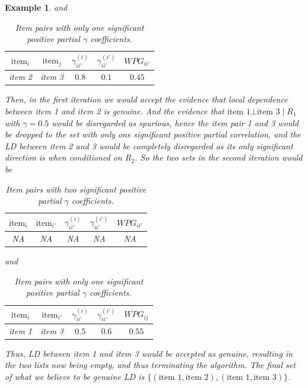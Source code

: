 \documentclass[a4project,12pt]{article}
\theoremstyle{examplestyle}
\newtheorem{example}{Example}[section]
\theoremstyle{defstyle}
\theoremstyle{thmstyle}
\begin{document}
\begin{mybox3}
\begin{example}
and 
\begin{table}[H]
    \centering
    \caption{Item pairs with only one significant positive partial $\gamma$ coefficients.}
    \begin{tabular}{c c c c c}
    \hline 
    $\text{item}_i$ & $\text{item}_j$ & $\gamma_{ii'}^{(i)}$ & $\gamma_{ii'}^{(i')}$ & $WPG_{ii'}$ \\
    \hline
         item 2 & item 3 & $0.8$ & $0.1$ & $0.45$  \\
         \hline
    \end{tabular}
    \label{tab:placeholder2}
\end{table}
Then, in the first iteration we would accept the evidence that local dependence between item 1 and item 2 is genuine. And the evidence that $\text{item 1}\bot \text{item 3}\mid R_1$ with $\gamma = 0.5$ would be disregarded as spurious, hence the item pair 1 and 3 would be dropped to the set with only one significant positive partial correlation, and the LD between item 2 and 3 would be completely disregarded as its only significant direction is when conditioned on $R_2$. So the two sets in the second iteration would be
\begin{table}[H]
    \centering
    \caption{Item pairs with two significant positive partial $\gamma$ coefficients.}
    \begin{tabular}{c c c c c}
    \hline 
    $\text{item}_i$ & $\text{item}_{i'}$ & $\gamma_{ii'}^{(i)}$ & $\gamma_{ii'}^{(i')}$ & $WPG_{ii'}$ \\
    \hline
         NA & NA & NA & NA & NA  \\
         \hline
    \end{tabular}
    \label{tab:placeholder3}
\end{table}
and 
\begin{table}[H]
    \centering
    \caption{Item pairs with only one significant positive partial $\gamma$ coefficients.}
    \begin{tabular}{c c c c c}
    \hline 
    $\text{item}_i$ & $\text{item}_{i'}$ & $\gamma_{ii'}^{(i)}$ & $\gamma_{ii'}^{(i')}$ & $WPG_{ij}$ \\
    \hline
         item 1 & item 3 & $0.5$ & $0.6$ & $0.55$  \\
         \hline
    \end{tabular}
    \label{tab:placeholder4}
\end{table}
Thus, LD between item 1 and item 3 would be accepted as genuine, resulting in the two lists now being empty, and thus terminating the algorithm. The final set of what we believe to be genuine LD is $\{(\text{item 1},\text{item 2}), (\text{item 1},\text{item 3})\}$.
    \end{example}
\end{mybox3}
\end{document}
